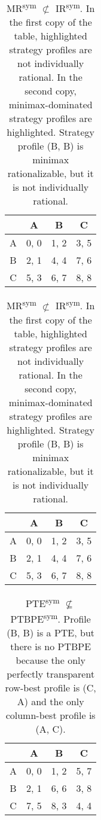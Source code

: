 \begin{table}
	\caption{
		MR\textsuperscript{sym} $\not\subset$ IR\textsuperscript{sym}.
		In the first copy of the table, highlighted strategy profiles are not individually rational.
		In the second copy, minimax-dominated strategy profiles are highlighted.
		Strategy profile (B, B) is minimax rationalizable, but it is not individually rational.
	}
	\label{tab:mr-not-sub-ir}
	\centering
	\begin{tabular}{|c|c|c|c|}
		\hline
			& A		& B	   & C	  \\
		\hline
		A 		&\cellcolor{gray!70} 0, 0 &\cellcolor{gray!70} 1, 2 &\cellcolor{gray!70} 3, 5 \\
		\hline
		B		&\cellcolor{gray!70} 2, 1 &\cellcolor{gray!70} 4, 4 &\cellcolor{gray!00} 7, 6 \\
		\hline
		C		&\cellcolor{gray!70} 5, 3 &\cellcolor{gray!00} 6, 7 &\cellcolor{gray!00} 8, 8 \\
		\hline
	\end{tabular}
	\hspace{1em}
	\begin{tabular}{|c|c|c|c|}
		\hline
			& A		& B	   & C	  \\
		\hline
		A 		&\cellcolor{gray!70} 0, 0 &\cellcolor{gray!70} 1, 2 &\cellcolor{gray!70} 3, 5 \\
		\hline
		B		&\cellcolor{gray!70} 2, 1 &\cellcolor{gray!00} 4, 4 &\cellcolor{gray!00} 7, 6 \\
		\hline
		C		&\cellcolor{gray!70} 5, 3 &\cellcolor{gray!00} 6, 7 &\cellcolor{gray!00} 8, 8 \\
		\hline
	\end{tabular}
\end{table}

\begin{table}
	\caption{
		PTE\textsuperscript{sym} $\not\subseteq$ PTBPE\textsuperscript{sym}.
		Profile (B, B) is a PTE, but there is no PTBPE because the only perfectly transparent row-best profile is (C, A) and the only column-best profile is (A, C).
	}
	\label{tab:pte-not-sub-ptbpe}
	\centering
	\begin{tabular}{|c|c|c|c|}
		\hline
			& A		& B	   & C	  \\
		\hline
		A 		&\cellcolor{gray!70} 0, 0 &\cellcolor{gray!70} 1, 2 &\cellcolor{gray!20} 5, 7 \\
		\hline
		B		&\cellcolor{gray!70} 2, 1 &\cellcolor{gray!00} 6, 6 &\cellcolor{gray!70} 3, 8 \\
		\hline
		C		&\cellcolor{gray!20} 7, 5 &\cellcolor{gray!20} 8, 3 &\cellcolor{gray!20} 4, 4 \\
		\hline
	\end{tabular}
\end{table}

